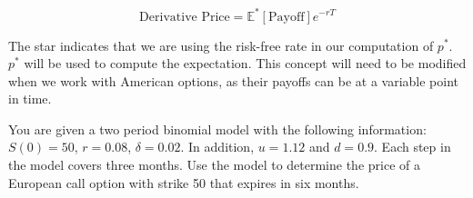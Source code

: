 \documentclass{ximera}
\begin{document}
\begin{equation*}
\text{Derivative Price}=\mathbb{E}^*[\text{Payoff}]e^{-rT}
\end{equation*}

The star indicates that we are using the risk-free rate in our computation of $p^*$. $p^*$ will be used to compute the expectation. This concept will need to be modified when we work with American options, as their payoffs can be at a variable point in time.

\begin{example}
You are given a two period binomial model with the following information: $S(0)=50$, $r=0.08$, $\delta=0.02$. In addition, $u=1.12$ and $d=0.9$. Each step in the model covers three months. Use the model to determine the price of a European call option with strike 50 that expires in six months. 
\end{example}
\end{document}
